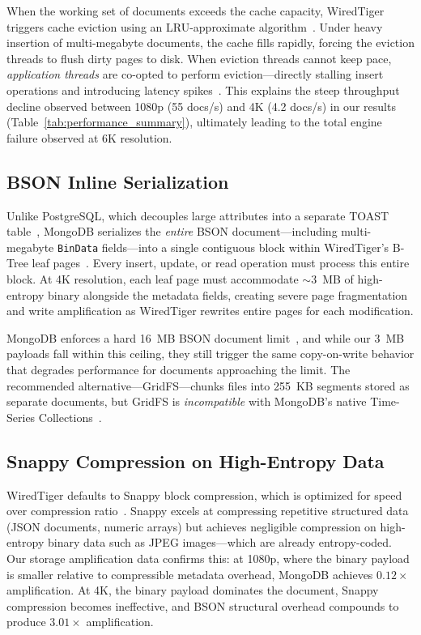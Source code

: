 \documentclass[conference]{IEEEtran}
\begin{document}
When the working set of documents exceeds the cache capacity, WiredTiger triggers cache eviction using an LRU-approximate algorithm~\cite{percona_wiredtiger_eviction}. Under heavy insertion of multi-megabyte documents, the cache fills rapidly, forcing the eviction threads to flush dirty pages to disk. When eviction threads cannot keep pace, \emph{application threads} are co-opted to perform eviction---directly stalling insert operations and introducing latency spikes~\cite{percona_wiredtiger_eviction}. This explains the steep throughput decline observed between 1080p (55 docs/s) and 4K (4.2 docs/s) in our results (Table~\ref{tab:performance_summary}), ultimately leading to the total engine failure observed at 6K resolution.

\subsection{BSON Inline Serialization}
Unlike PostgreSQL, which decouples large attributes into a separate TOAST table~\cite{postgresql_toast_docs}, MongoDB serializes the \emph{entire} BSON document---including multi-megabyte \texttt{BinData} fields---into a single contiguous block within WiredTiger's B-Tree leaf pages~\cite{mongodb_bson_spec}. Every insert, update, or read operation must process this entire block. At 4K resolution, each leaf page must accommodate $\sim$3~MB of high-entropy binary alongside the metadata fields, creating severe page fragmentation and write amplification as WiredTiger rewrites entire pages for each modification.

MongoDB enforces a hard 16~MB BSON document limit~\cite{mongodb_bson_spec}, and while our 3~MB payloads fall within this ceiling, they still trigger the same copy-on-write behavior that degrades performance for documents approaching the limit. The recommended alternative---GridFS---chunks files into 255~KB segments stored as separate documents, but GridFS is \emph{incompatible} with MongoDB's native Time-Series Collections~\cite{mongodb_ts_limitations}.

\subsection{Snappy Compression on High-Entropy Data}
WiredTiger defaults to Snappy block compression, which is optimized for speed over compression ratio~\cite{mongodb_wiredtiger_storage}. Snappy excels at compressing repetitive structured data (JSON documents, numeric arrays) but achieves negligible compression on high-entropy binary data such as JPEG images---which are already entropy-coded. Our storage amplification data confirms this: at 1080p, where the binary payload is smaller relative to compressible metadata overhead, MongoDB achieves $0.12\times$ amplification. At 4K, the binary payload dominates the document, Snappy compression becomes ineffective, and BSON structural overhead compounds to produce $3.01\times$ amplification.
\end{document}
